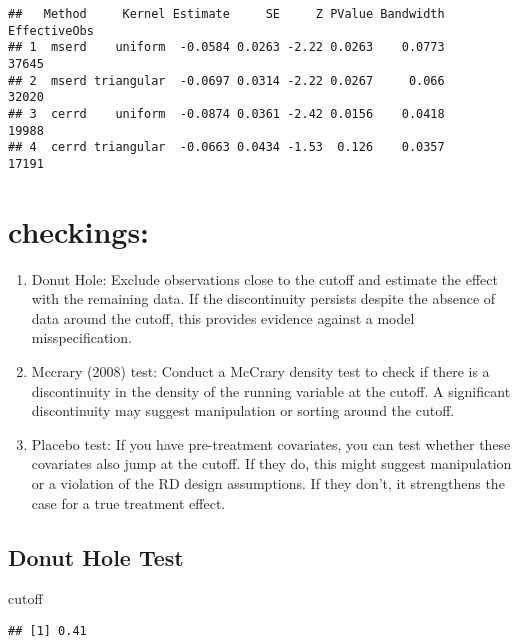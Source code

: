 \documentclass[
]{article}
\newenvironment{Shaded}{\begin{snugshade}}{\end{snugshade}}
\newcommand{\NormalTok}[1]{#1}
\providecommand{\tightlist}{%
  \setlength{\itemsep}{0pt}\setlength{\parskip}{0pt}}
\begin{document}
\begin{verbatim}
##   Method     Kernel Estimate     SE     Z PValue Bandwidth EffectiveObs
## 1  mserd    uniform  -0.0584 0.0263 -2.22 0.0263    0.0773        37645
## 2  mserd triangular  -0.0697 0.0314 -2.22 0.0267     0.066        32020
## 3  cerrd    uniform  -0.0874 0.0361 -2.42 0.0156    0.0418        19988
## 4  cerrd triangular  -0.0663 0.0434 -1.53  0.126    0.0357        17191
\end{verbatim}

\hypertarget{checkings}{%
\section{checkings:}\label{checkings}}

\begin{enumerate}
\def\labelenumi{\arabic{enumi}.}
\tightlist
\item
  Donut Hole: Exclude observations close to the cutoff and estimate the
  effect with the remaining data. If the discontinuity persists despite
  the absence of data around the cutoff, this provides evidence against
  a model misspecification.
\item
  Mccrary (2008) test: Conduct a McCrary density test to check if there
  is a discontinuity in the density of the running variable at the
  cutoff. A significant discontinuity may suggest manipulation or
  sorting around the cutoff.
\item
  Placebo test: If you have pre-treatment covariates, you can test
  whether these covariates also jump at the cutoff. If they do, this
  might suggest manipulation or a violation of the RD design
  assumptions. If they don't, it strengthens the case for a true
  treatment effect.
\end{enumerate}

\hypertarget{donut-hole-test}{%
\subsection{Donut Hole Test}\label{donut-hole-test}}

\begin{Shaded}
\begin{Highlighting}[]
\NormalTok{cutoff}
\end{Highlighting}
\end{Shaded}

\begin{verbatim}
## [1] 0.41
\end{verbatim}
\end{document}
